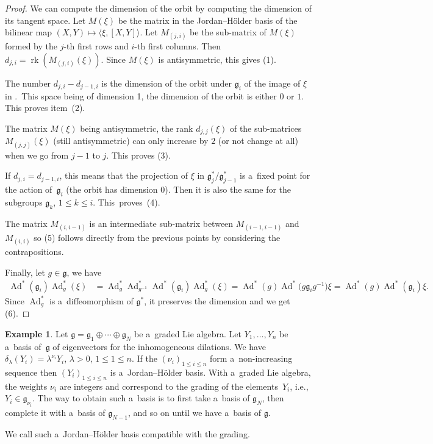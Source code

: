 \documentclass[10pt,a4paper]{article}
\newcommand{\Ad}{\operatorname{Ad}} %
\newcommand{\g}{\mathfrak{g}} %
\newcommand{\lag}{\langle}
\newcommand{\rag}{\rangle}
\newcommand{\rk}{\operatorname{rk}} %
\numberwithin{equation}{section}
\theoremstyle{definition}
\newtheorem{ex}[thm]{Example}
\begin{document}
\begin{proof}
 We can compute the dimension of the orbit by computing the dimension of its tangent space. Let $M(\xi)$ be the matrix in the Jordan--H\"older basis of the bilinear map
 $(X,Y) \mapsto \lag\xi,[X,Y]\rag$.
 Let $M_{(j,i)}$ be the sub-matrix of $M(\xi)$ formed by the $j$-th first rows and $i$-th first columns. Then $d_{j,i} = \rk(M_{(j,i)}(\xi))$. Since $M(\xi)$ is antisymmetric, this gives (1).

 The number $d_{j,i}-d_{j-1,i}$ is the dimension of the orbit under $\g_i$ of the image of $\xi$ in \smash{${\g_j^*}/{\g_{j-1}^*}$}.~This space being of dimension 1, the dimension of the orbit is either $0$ or $1$. This proves item~(2).

 The matrix $M(\xi)$ being antisymmetric, the rank $d_{j,j}(\xi)$ of the sub-matrices $M_{(j,j)}(\xi)$ (still antisymmetric) can only increase by $2$ (or not change at all) when we go from $j-1$ to $j$. This proves (3).

 If $d_{j,i} = d_{j-1,i}$, this means that the projection of $\xi$ in ${\g_j^*}/{\g_{j-1}^*}$ is a~fixed point for the action of~$\g_i$ (the orbit has dimension $0$). Then it is also the same for the subgroups $\g_k$, $1\leq k \leq i$. This~proves~(4).

 The matrix $M_{(i,i-1)}$ is an intermediate sub-matrix between $M_{(i-1,i-1)}$ and $M_{(i,i)}$ so (5) follows directly from the previous points by considering the contrapositions.

 Finally, let $g\in \g$, we have
 \begin{align*}
 \Ad^*(\g_i)\Ad^*_g(\xi) &= \Ad^*_g\Ad^*_{g^{-1}}\Ad^*(\g_i)\Ad^*_g(\xi) = \Ad^*(g)\Ad^*\bigl(g\g_ig^{-1}\bigr)\xi= \Ad^*(g)\Ad^*(\g_i)\xi.
 \end{align*}
 Since $\Ad^*_g$ is a~diffeomorphism of $\g^*$, it preserves the dimension and we get (6).
\end{proof}

\begin{ex}
 Let $\g = \g_1\oplus\cdots\oplus \g_N$ be a~graded Lie algebra. Let $Y_1, \dots, Y_n$ be a~basis of~$\g$ of eigenvectors for the inhomogeneous dilations. We have $\delta_{\lambda}(Y_i) = \lambda^{\nu_i}Y_i$, $\lambda>0$, $1\leq 1 \leq n$. If the $(\nu_i)_{1\leq i \leq n}$ form a~non-increasing sequence then $(Y_i)_{1\leq i \leq n}$ is a~Jordan--H\"older basis. With a~graded Lie algebra, the weights $\nu_i$ are integers and correspond to the grading of the elements~$Y_i$, i.e., $Y_i \in \g_{\nu_i}$. The way to obtain such a~basis is to first take a~basis of $\g_N$, then complete it with a~basis of $\g_{N-1}$, and so on until we have a~basis of $\g$.

 We call such a~Jordan--H\"older basis compatible with the grading.
\end{ex}
\end{document}
